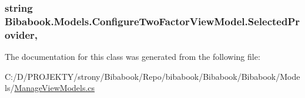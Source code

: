 \subsubsection[{Selected\+Provider}]{\setlength{\rightskip}{0pt plus 5cm}string Bibabook.\+Models.\+Configure\+Two\+Factor\+View\+Model.\+Selected\+Provider\hspace{0.3cm}{\ttfamily [get]}, {\ttfamily [set]}}\label{class_bibabook_1_1_models_1_1_configure_two_factor_view_model_a0ccb3f50c860f1e37f665640ca59f919}


The documentation for this class was generated from the following file\+:\begin{DoxyCompactItemize}
\item 
C\+:/\+D/\+P\+R\+O\+J\+E\+K\+T\+Y/strony/\+Bibabook/\+Repo/bibabook/\+Bibabook/\+Bibabook/\+Models/\hyperlink{_manage_view_models_8cs}{Manage\+View\+Models.\+cs}\end{DoxyCompactItemize}
